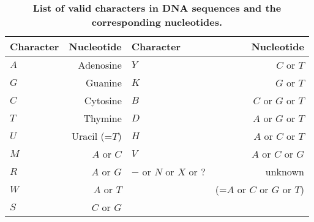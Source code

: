 \documentclass[a4paper,12pt]{article}
\begin{document}
\begin{table}
\begin{center}
\begin{tabular}{lr|lr}
\hline
Character & Nucleotide &   Character & Nucleotide \\               
\hline                                   
$A$       & Adenosine &     $Y$       & $C$ or $T$ \\                 
$G$       & Guanine &       $K$       & $G$ or $T$ \\               
$C$       & Cytosine &      $B$       & $C$ or $G$ or $T$\\         
$T$       & Thymine &       $D$       & $A$ or $G$ or $T$ \\        
$U$       & Uracil (=$T$) & $H$       & $A$ or $C$ or $T$ \\        
$M$       & $A$ or $C$ &    $V$       & $A$ or $C$ or $G$ \\        
$R$       & $A$ or $G$ &    $-$ or $N$ or $X$ or $?$ & unknown  \\  
$W$       & $A$ or $T$ &    & (=$A$ or $C$ or $G$ or $T$)\\         
$S$       & $C$ or $G$ &   & \\
\hline
\end{tabular}
\end{center}
\caption{{\bf List of valid characters in DNA sequences and the corresponding nucleotides.}}\label{tab:ambigu_nt}
\end{table}
\end{document}
